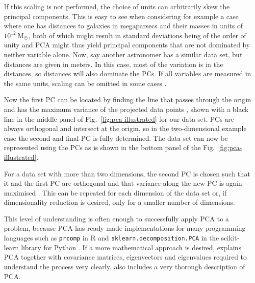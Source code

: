 \documentclass[english, twoside]{HYgradu}
\begin{document}
If this scaling is not performed, the choice of units can arbitrarily skew the principal components. This is easy to see when considering for example a case where one has distances to galaxies in megaparsecs and their masses in units of $10^{12}\ \mathrm{M_{\astrosun}}$, both of which might result in standard deviations being of the order of unity and PCA might thus yield principal components that are not dominated by neither variable alone. Now, say another astronomer has a similar data set, but distances are given in meters. In this case, most of the variation is in the distances, so distances will also dominate the PCs. If all variables are measured in the same units, scaling can be omitted in some cases \citep{james2013introduction}.

Now the first PC can be located by finding the line that passes through the origin and has the maximum variance of the projected data points \citep{jolliffe2002principal}, shown with a black line in the middle panel of Fig.\ \ref{fig:pca-illustrated} for our data set. PCs are always orthogonal and intersect at the origin, so in the two-dimensional example case the second and final PC is fully determined. The data set can now be represented using the PCs as is shown in the bottom panel of the Fig.\ \ref{fig:pca-illustrated}.

For a data set with more than two dimensions, the second PC is chosen such that it and the first PC are orthogonal and that variance along the new PC is again maximised \citep{jolliffe2002principal}. This can be repeated for each dimension of the data set or, if dimensionality reduction is desired, only for a smaller number of dimensions.

This level of understanding is often enough to successfully apply PCA to a problem, because PCA has ready-made implementations for many programming languages such as \texttt{prcomp} in R \citep{james2013introduction} and \texttt{sklearn.decomposition.PCA} in the scikit-learn library  for Python \citep{scikit-learn}. If a more mathematical approach is desired, \citet{smith2002tutorial} explains PCA together with covariance matrices, eigenvectors and eigenvalues required to understand the process very clearly. \citet{jolliffe2002principal} also includes a very thorough description of PCA.
\end{document}
